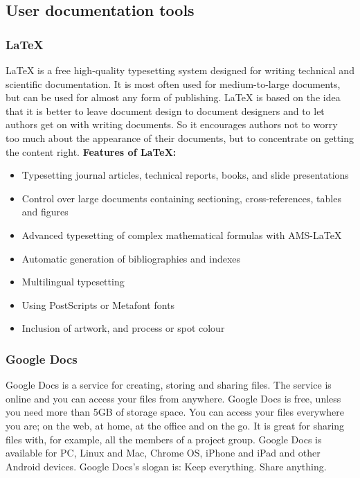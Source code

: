 \subsection{User documentation tools}

\subsubsection{LaTeX}
LaTeX is a free high-quality typesetting system designed for writing technical and scientific documentation. It is most often used for medium-to-large documents, but can be used for almost any form of publishing. 
\newline
\newline
LaTeX is based on the idea that it is better to leave document design to document designers and to let authors get on with writing documents. So it encourages authors not to worry too much about the appearance of their documents, but to concentrate on getting the content right.
\newline
\newline
\textbf{Features of LaTeX:}
\begin{itemize}
\item{}Typesetting journal articles, technical reports, books, and slide presentations
\item{}Control over large documents containing sectioning, cross-references, tables and figures
\item{}Advanced typesetting of complex mathematical formulas with AMS-LaTeX
\item{}Automatic generation of bibliographies and indexes
\item{}Multilingual typesetting
\item{}Using PostScripts or Metafont fonts
\item{}Inclusion of artwork, and process or spot colour
\end{itemize}

\subsubsection{Google Docs}
Google Docs is a service for creating, storing and sharing files. The service is online and you can access your files from anywhere. Google Docs is free, unless you need more than 5GB of storage space. You can access your files everywhere you are; on the web, at home, at the office and on the go. It is great for sharing files with, for example, all the members of a project group. Google Docs is available for PC, Linux and Mac, Chrome OS, iPhone and iPad and other Android devices.
\newline
\newline
Google Docs’s slogan is:  Keep everything. Share anything.

